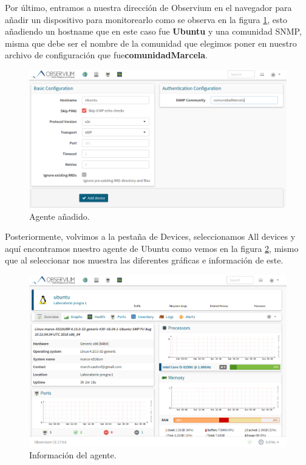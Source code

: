 Por último, entramos a nuestra dirección de Observium en el navegador para añadir un dispositivo para monitorearlo como se observa en la figura \ref{image:device}, esto añadiendo un hostname que en este caso fue \textbf{Ubuntu} y una comunidad SNMP, misma que debe ser el nombre de la comunidad que elegimos poner en nuestro archivo de configuración que fue\textbf{comunidadMarcela}.
\FloatBarrier
\begin{figure}[htbp!]
		\centering
			\includegraphics[width=.9 \textwidth]{images/device}
		\caption{Agente añadido.}
		\label{image:device}
\end{figure}
\FloatBarrier

Posteriormente, volvimos a la pestaña de Devices, seleccionamos All devices y aquí encontramos nuestro agente de Ubuntu como vemos en la figura \ref{image:deviceinfo}, mismo que al seleccionar nos muestra las diferentes gráficas e información de este.
\FloatBarrier
\begin{figure}[htbp!]
		\centering
			\includegraphics[width=.9 \textwidth]{images/deviceinfo}
		\caption{Información del agente.}
		\label{image:deviceinfo}
\end{figure}
\FloatBarrier